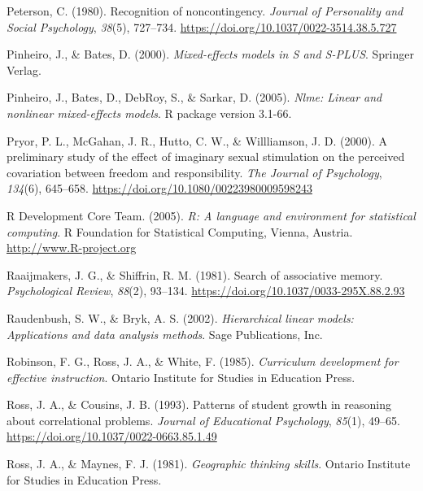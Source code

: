 \documentclass[11pt]{umnthesis}
\newlength{\cslhangindent}
\newenvironment{CSLReferences}[2] %
 {%
  \setlength{\parindent}{0pt}
  \ifodd #1 \everypar{\setlength{\hangindent}{\cslhangindent}}\ignorespaces\fi
  \ifnum #2 > 0
  \setlength{\parskip}{#2\baselineskip}
  \fi
 }%
 {}
\begin{document}
\begin{CSLReferences}{1}{0}
\leavevmode{}%
Peterson, C. (1980). Recognition of noncontingency. \emph{Journal of Personality and Social Psychology}, \emph{38}(5), 727--734. \url{https://doi.org/10.1037/0022-3514.38.5.727}

\leavevmode{}%
Pinheiro, J., \& Bates, D. (2000). \emph{Mixed-effects models in {S} and {S-PLUS}}. Springer Verlag.

\leavevmode{}%
Pinheiro, J., Bates, D., DebRoy, S., \& Sarkar, D. (2005). \emph{Nlme: Linear and nonlinear mixed-effects models}. {R package version 3.1-66}.

\leavevmode{}%
Pryor, P. L., McGahan, J. R., Hutto, C. W., \& Willliamson, J. D. (2000). A preliminary study of the effect of imaginary sexual stimulation on the perceived covariation between freedom and responsibility. \emph{The Journal of Psychology}, \emph{134}(6), 645--658. \url{https://doi.org/10.1080/00223980009598243}

\leavevmode{}%
R Development Core Team. (2005). \emph{R: A language and environment for statistical computing}. {R Foundation for Statistical Computing, Vienna, Austria}. \url{http://www.R-project.org}

\leavevmode{}%
Raaijmakers, J. G., \& Shiffrin, R. M. (1981). Search of associative memory. \emph{Psychological Review}, \emph{88}(2), 93--134. \url{https://doi.org/10.1037/0033-295X.88.2.93}

\leavevmode{}%
Raudenbush, S. W., \& Bryk, A. S. (2002). \emph{Hierarchical linear models: Applications and data analysis methods}. Sage Publications, Inc.

\leavevmode{}%
Robinson, F. G., Ross, J. A., \& White, F. (1985). \emph{Curriculum development for effective instruction}. Ontario Institute for Studies in Education Press.

\leavevmode{}%
Ross, J. A., \& Cousins, J. B. (1993). Patterns of student growth in reasoning about correlational problems. \emph{Journal of Educational Psychology}, \emph{85}(1), 49--65. \url{https://doi.org/10.1037/0022-0663.85.1.49}

\leavevmode{}%
Ross, J. A., \& Maynes, F. J. (1981). \emph{Geographic thinking skills}. Ontario Institute for Studies in Education Press.


\end{CSLReferences}
\end{document}
